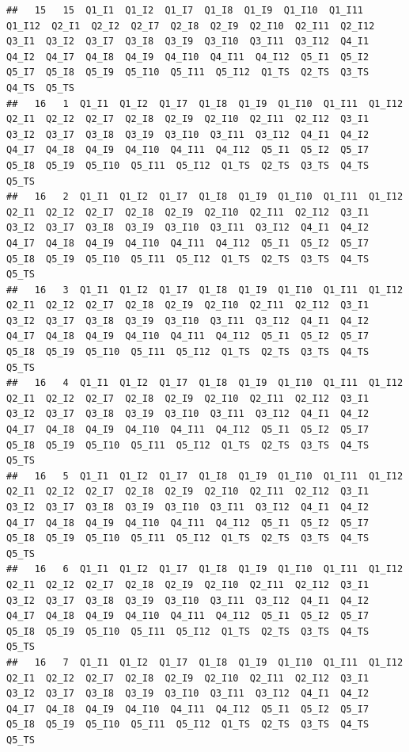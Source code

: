 \documentclass[]{book}
\begin{document}
\begin{verbatim}
##   15   15  Q1_I1  Q1_I2  Q1_I7  Q1_I8  Q1_I9  Q1_I10  Q1_I11  Q1_I12  Q2_I1  Q2_I2  Q2_I7  Q2_I8  Q2_I9  Q2_I10  Q2_I11  Q2_I12  Q3_I1  Q3_I2  Q3_I7  Q3_I8  Q3_I9  Q3_I10  Q3_I11  Q3_I12  Q4_I1  Q4_I2  Q4_I7  Q4_I8  Q4_I9  Q4_I10  Q4_I11  Q4_I12  Q5_I1  Q5_I2  Q5_I7  Q5_I8  Q5_I9  Q5_I10  Q5_I11  Q5_I12  Q1_TS  Q2_TS  Q3_TS  Q4_TS  Q5_TS
##   16   1  Q1_I1  Q1_I2  Q1_I7  Q1_I8  Q1_I9  Q1_I10  Q1_I11  Q1_I12  Q2_I1  Q2_I2  Q2_I7  Q2_I8  Q2_I9  Q2_I10  Q2_I11  Q2_I12  Q3_I1  Q3_I2  Q3_I7  Q3_I8  Q3_I9  Q3_I10  Q3_I11  Q3_I12  Q4_I1  Q4_I2  Q4_I7  Q4_I8  Q4_I9  Q4_I10  Q4_I11  Q4_I12  Q5_I1  Q5_I2  Q5_I7  Q5_I8  Q5_I9  Q5_I10  Q5_I11  Q5_I12  Q1_TS  Q2_TS  Q3_TS  Q4_TS  Q5_TS
##   16   2  Q1_I1  Q1_I2  Q1_I7  Q1_I8  Q1_I9  Q1_I10  Q1_I11  Q1_I12  Q2_I1  Q2_I2  Q2_I7  Q2_I8  Q2_I9  Q2_I10  Q2_I11  Q2_I12  Q3_I1  Q3_I2  Q3_I7  Q3_I8  Q3_I9  Q3_I10  Q3_I11  Q3_I12  Q4_I1  Q4_I2  Q4_I7  Q4_I8  Q4_I9  Q4_I10  Q4_I11  Q4_I12  Q5_I1  Q5_I2  Q5_I7  Q5_I8  Q5_I9  Q5_I10  Q5_I11  Q5_I12  Q1_TS  Q2_TS  Q3_TS  Q4_TS  Q5_TS
##   16   3  Q1_I1  Q1_I2  Q1_I7  Q1_I8  Q1_I9  Q1_I10  Q1_I11  Q1_I12  Q2_I1  Q2_I2  Q2_I7  Q2_I8  Q2_I9  Q2_I10  Q2_I11  Q2_I12  Q3_I1  Q3_I2  Q3_I7  Q3_I8  Q3_I9  Q3_I10  Q3_I11  Q3_I12  Q4_I1  Q4_I2  Q4_I7  Q4_I8  Q4_I9  Q4_I10  Q4_I11  Q4_I12  Q5_I1  Q5_I2  Q5_I7  Q5_I8  Q5_I9  Q5_I10  Q5_I11  Q5_I12  Q1_TS  Q2_TS  Q3_TS  Q4_TS  Q5_TS
##   16   4  Q1_I1  Q1_I2  Q1_I7  Q1_I8  Q1_I9  Q1_I10  Q1_I11  Q1_I12  Q2_I1  Q2_I2  Q2_I7  Q2_I8  Q2_I9  Q2_I10  Q2_I11  Q2_I12  Q3_I1  Q3_I2  Q3_I7  Q3_I8  Q3_I9  Q3_I10  Q3_I11  Q3_I12  Q4_I1  Q4_I2  Q4_I7  Q4_I8  Q4_I9  Q4_I10  Q4_I11  Q4_I12  Q5_I1  Q5_I2  Q5_I7  Q5_I8  Q5_I9  Q5_I10  Q5_I11  Q5_I12  Q1_TS  Q2_TS  Q3_TS  Q4_TS  Q5_TS
##   16   5  Q1_I1  Q1_I2  Q1_I7  Q1_I8  Q1_I9  Q1_I10  Q1_I11  Q1_I12  Q2_I1  Q2_I2  Q2_I7  Q2_I8  Q2_I9  Q2_I10  Q2_I11  Q2_I12  Q3_I1  Q3_I2  Q3_I7  Q3_I8  Q3_I9  Q3_I10  Q3_I11  Q3_I12  Q4_I1  Q4_I2  Q4_I7  Q4_I8  Q4_I9  Q4_I10  Q4_I11  Q4_I12  Q5_I1  Q5_I2  Q5_I7  Q5_I8  Q5_I9  Q5_I10  Q5_I11  Q5_I12  Q1_TS  Q2_TS  Q3_TS  Q4_TS  Q5_TS
##   16   6  Q1_I1  Q1_I2  Q1_I7  Q1_I8  Q1_I9  Q1_I10  Q1_I11  Q1_I12  Q2_I1  Q2_I2  Q2_I7  Q2_I8  Q2_I9  Q2_I10  Q2_I11  Q2_I12  Q3_I1  Q3_I2  Q3_I7  Q3_I8  Q3_I9  Q3_I10  Q3_I11  Q3_I12  Q4_I1  Q4_I2  Q4_I7  Q4_I8  Q4_I9  Q4_I10  Q4_I11  Q4_I12  Q5_I1  Q5_I2  Q5_I7  Q5_I8  Q5_I9  Q5_I10  Q5_I11  Q5_I12  Q1_TS  Q2_TS  Q3_TS  Q4_TS  Q5_TS
##   16   7  Q1_I1  Q1_I2  Q1_I7  Q1_I8  Q1_I9  Q1_I10  Q1_I11  Q1_I12  Q2_I1  Q2_I2  Q2_I7  Q2_I8  Q2_I9  Q2_I10  Q2_I11  Q2_I12  Q3_I1  Q3_I2  Q3_I7  Q3_I8  Q3_I9  Q3_I10  Q3_I11  Q3_I12  Q4_I1  Q4_I2  Q4_I7  Q4_I8  Q4_I9  Q4_I10  Q4_I11  Q4_I12  Q5_I1  Q5_I2  Q5_I7  Q5_I8  Q5_I9  Q5_I10  Q5_I11  Q5_I12  Q1_TS  Q2_TS  Q3_TS  Q4_TS  Q5_TS

\end{verbatim}
\end{document}
